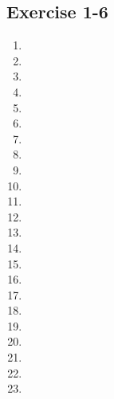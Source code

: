 \subsection{Exercise 1-6} %
\begin{multicols}{2}
\begin{enumerate}[itemsep=5pt, label=\textbf{\arabic*}. ] 
\item %
\item %
\item %
\item %
\item %
\item %
\item %
\item %
\item %
\item %
\item %
\item %
\item %
\item %
\item %
\item %
\item %
\item %
\item %
\item %
\item %
\item %
\item %
\end{enumerate}
\end{multicols}

